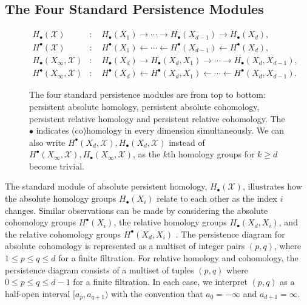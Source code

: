 \subsection{The Four Standard Persistence Modules}
\label{TheFourStandardPersistenceModules}
\begin{figure}[t!]
	\begin{align*}
		H_{\bullet}(\mathcal{X})             & : \quad H_{\bullet}(X_{1}) \rightarrow \cdots \rightarrow H_{\bullet}(X_{d-1}) \rightarrow H_{\bullet}(X_{d}),             \\
		H^{\bullet}(\mathcal{X})             & : \quad H^{\bullet}(X_{1}) \leftarrow \cdots \leftarrow H^{\bullet}(X_{d-1}) \leftarrow H^{\bullet}(X_{d}),                \\
		H_{\bullet}(X_{\infty}, \mathcal{X}) & : \quad H_{\bullet}(X_{d}) \rightarrow H_{\bullet}(X_{d},X_{1}) \rightarrow \cdots \rightarrow H_{\bullet}(X_{d},X_{d-1}), \\
		H^{\bullet}(X_{\infty}, \mathcal{X}) & : \quad H^{\bullet}(X_{d}) \leftarrow H^{\bullet}(X_{d},X_{1}) \leftarrow \cdots \leftarrow H^{\bullet}(X_{d}, X_{d-1}).
	\end{align*}
	\caption{The four standard persistence modules are from top to bottom: persistent absolute homology, persistent absolute cohomology, persistent relative homology and persistent relative cohomology. The $\bullet$ indicates (co)homology in every dimension simultaneously. We can also write $H^{\bullet}(X_{d}, \mathcal{X}), H_{\bullet}(X_{d}, \mathcal{X})$ instead of $H^{\bullet}(X_{\infty}, \mathcal{X}), H_{\bullet}(X_{\infty}, \mathcal{X})$, as the $k$th homology groups for $k \geq d$ become trivial.}
\end{figure}
The standard module of absolute persistent homology, $H_{\bullet}(\mathcal{X})$, illustrates how the absolute homology groups
$H_{\bullet}(X_{i})$ relate to each other as the index $i$ changes. Similar observations
can be made by considering the absolute cohomology groups $H^{\bullet}(X_{i})$,
the relative homology groups $H_{\bullet}(X_{d}, X_{i})$, and the relative cohomology
groups $H^{\bullet}(X_{d}, X_{i})$ \cite[\S 2.4]{de2011dualities}. The persistence diagram for absolute cohomology is represented as a multiset of integer
pairs $(p,q)$, where $1 \leq p \leq q \leq d$ for a finite filtration. For relative
homology and cohomology, the persistence diagram consists of a multiset of
tuples $(p,q)$ where $0 \leq p \leq q \leq d-1$ for a finite filtration. In each
case, we interpret $(p,q)$ as a half-open interval $[a_{p}, a_{q+1})$ with the
convention that $a_{0} = -\infty$ and $a_{d+1} = \infty$.

